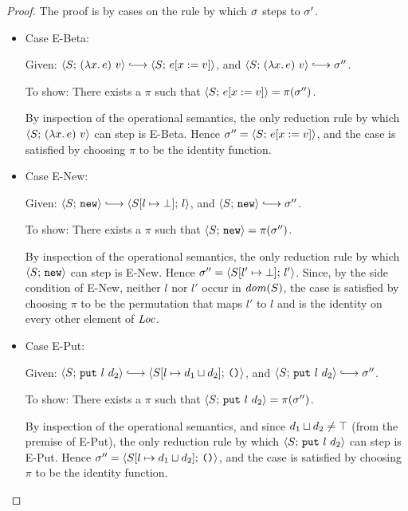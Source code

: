 \begin{proof}
  The proof is by cases on the rule by which $\sigma$ steps to
  $\sigma'$.

  \begin{itemize}

    \item Case {\sc E-Beta}:

      Given:
      $\config{S}{\app{(\lam{x}{e})}{v}} \parstepsto \config{S}{\subst{e}{x}{v}}$,
      and $\config{S}{\app{(\lam{x}{e})}{v}} \parstepsto \conf''$.

      To show: There exists a $\pi$ such that
      $\langle S;\, e[x := v] \rangle = \pi(\sigma'')$.

      By inspection of the operational semantics, the only reduction
      rule by which $\langle S;\, (\lambda x.\,e)~v \rangle$ can step is
      {\sc E-Beta}.  Hence $\sigma'' = \langle S;\, e[x := v] \rangle$,
      and the case is satisfied by choosing $\pi$ to be the identity
      function.

      \item Case {\sc E-New}: 

      Given:
      $\config{S}{\NEW} \parstepsto \config{\extSRaw{S}{l}{\bot}}{l}$,
      and $\config{S}{\NEW} \parstepsto \conf''$.

      To show: There exists a $\pi$ such that $\langle S;\, \mbox{\texttt{new}} \rangle
      = \pi(\sigma'')$.

      By inspection of the operational semantics, the only reduction
      rule by which $\langle S;\, \mbox{\texttt{new}} \rangle$ can step is {\sc E-New}.  Hence
      $\sigma'' = \langle S[l' \mapsto \bot];\, l' \rangle$.  Since, by the
      side condition of {\sc E-New}, neither $l$ nor $l'$ occur in
      $\mathit{dom}(S)$, the case is satisfied by choosing $\pi$ to be the
      permutation that maps $l'$ to $l$ and is the identity on every
      other element of $\mathit{Loc}$.

      \item Case {\sc E-Put}:

      Given:
      $\config{S}{\putexp{l}{d_2}} \parstepsto \config{\extSRaw{S}{l}{\userlub{d_1}{d_2}}}{\unit}$,
      and $\config{S}{\putexp{l}{d_2}} \parstepsto \conf''$.

      To show: There exists a $\pi$ such that
      $\langle S;\, \mbox{\texttt{put}}~l~d_2 \rangle = \pi(\sigma'')$.

      By inspection of the operational semantics, and since
      $d_1 \sqcup d_2 \neq \top$ (from the premise of {\sc
      E-Put}), the only reduction rule by which
      $\langle S;\, \mbox{\texttt{put}}~l~d_2 \rangle$ can step is {\sc E-Put}.  Hence
      $\sigma'' = \langle S[l \mapsto d_1 \sqcup d_2];\, \mbox{\texttt{()}} \rangle$,
      and the case is satisfied by choosing $\pi$ to be the identity
      function.


\end{itemize}
\end{proof}

